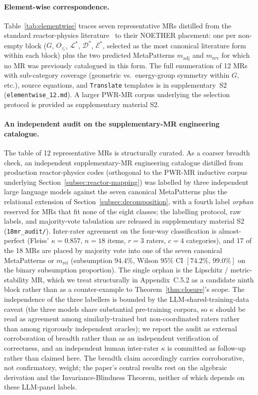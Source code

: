 \documentclass[manuscript]{acmart}
\begin{document}
\paragraph{Element-wise correspondence.} Table~\ref{tab:elementwise} traces seven representative MRs distilled from the standard reactor-physics literature~\cite{BellGlasstone1970, LewisMiller1993} to their NOETHER placement: one per non-empty block ($G$, $O_{\le}$, $\mathcal{L}^{*}$, $\mathcal{D}^{*}$, $\mathcal{E}^{*}$, selected as the most canonical literature form within each block) plus the two predicted MetaPatterns $m_{\mathrm{adj}}$ and $m_{\mathrm{rev}}$ for which no MR was previously catalogued in this form. The full enumeration of 12 MRs with sub-category coverage (geometric vs.\ energy-group symmetry within $G$, etc.), source equations, and \texttt{Translate} templates is in supplementary~S2 (\texttt{elementwise\_12.md}). A larger PWR-MR corpus underlying the selection protocol is provided as supplementary material S2.

\paragraph{An independent audit on the supplementary-MR engineering catalogue.} The table of 12 representative MRs is structurally curated. As a coarser breadth check, an independent supplementary-MR engineering catalogue distilled from production reactor-physics codes (orthogonal to the PWR-MR inductive corpus underlying Section~\ref{subsec:reactor-mapping}) was labelled by three independent large language models against the seven canonical MetaPatterns plus the relational extension of Section~\ref{subsec:decomposition}, with a fourth label \emph{orphan} reserved for MRs that fit none of the eight classes; the labelling protocol, raw labels, and majority-vote tabulation are released in supplementary material S2 (\texttt{18mr\_audit/}). Inter-rater agreement on the four-way classification is almost-perfect (Fleiss' $\kappa = 0.857$, $n=18$ items, $r=3$ raters, $c=4$ categories), and 17 of the 18 MRs are placed by majority vote into one of the seven canonical MetaPatterns or $m_{\mathrm{rel}}$ (subsumption $94.4\%$, Wilson $95\%$ CI $[74.2\%,\, 99.0\%]$ on the binary subsumption proportion). The single orphan is the Lipschitz / metric-stability MR, which we treat structurally in Appendix~C.5.2 as a candidate ninth block rather than as a counter-example to Theorem~\ref{thm:closure}'s scope. The independence of the three labellers is bounded by the LLM-shared-training-data caveat (the three models share substantial pre-training corpora, so $\kappa$ should be read as agreement among similarly-trained but non-coordinated raters rather than among rigorously independent oracles); we report the audit as external corroboration of breadth rather than as an independent verification of correctness, and an independent human inter-rater $\kappa$ is committed as follow-up rather than claimed here. The breadth claim accordingly carries corroborative, not confirmatory, weight; the paper's central results rest on the algebraic derivation and the Invariance-Blindness Theorem, neither of which depends on these LLM-panel labels.
\end{document}
